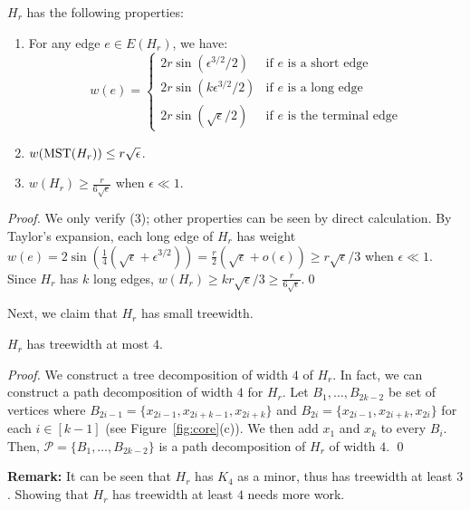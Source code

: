 \begin{observation}\label{obs:edge-length} $H_r$ has the following properties:
	\begin{enumerate}
		\item  For any edge $e \in E(H_r)$, we have:
		\begin{equation}
		w(e) = \begin{cases} 2r\sin(\epsilon^{3/2}/2) &\text{if $e$ is a short edge}\\
		2r\sin(k\epsilon^{3/2}/2) &\text{if $e$ is a long edge}\\ 2r\sin(\sqrt{\epsilon}/2) &\text{if $e$ is the terminal edge}
		\end{cases}
		\end{equation}
		\item $w(\mathrm{MST}(H_r)) \leq r\sqrt{\epsilon}$.
		\item $w(H_r) \geq \frac{r}{6\sqrt{\epsilon}}$ when $\epsilon \ll 1$.
	\end{enumerate}
	\begin{proof}
		We only verify (3); other properties can be seen by direct calculation. By Taylor's expansion, each long edge of $H_r$ has weight $w(e) = 2\sin(\frac{1}{4}(\sqrt{\epsilon} +\epsilon^{3/2})) =  \frac{r}{2}(\sqrt{\epsilon} + o(\epsilon)) \geq r\sqrt{\epsilon}/3$ when $\epsilon \ll 1$. Since $H_r$ has $k$ long edges, $w(H_r) \geq k r \sqrt{\epsilon}/3 \geq  \frac{r}{6\sqrt{\epsilon}}$.\qed
	\end{proof}
\end{observation}

\noindent Next, we claim that $H_r$ has small treewidth.

\begin{claim} \label{clm:treewidth} $H_r$ has treewidth at most $4$.
\end{claim}
\begin{proof}
	We construct a tree decomposition of width $4$ of $H_r$. In fact, we can construct a path decomposition of width $4$ for $H_r$. Let $B_1,\ldots, B_{2k-2}$ be set of vertices where $B_{2i-1}= \{x_{2i-1},x_{2i+k-1}, x_{2i+k}\}$  and $B_{2i}= \{x_{2i-1}, x_{2i+k}, x_{2i}\}$  for each $i \in [k-1]$ (see Figure~\ref{fig:core}(c)). We then add $x_1$ and $x_{k}$ to every $B_i$. Then, $\mathcal{P} = \{B_1,\ldots, B_{2k-2}\}$ is a path decomposition of $H_r$ of width $4$. \qed
\end{proof}

\noindent \textbf{Remark:} It can be seen that $H_r$ has $K_4$ as a minor, thus has treewidth at least $3$. Showing that $H_r$ has treewidth at least $4$ needs more work.

